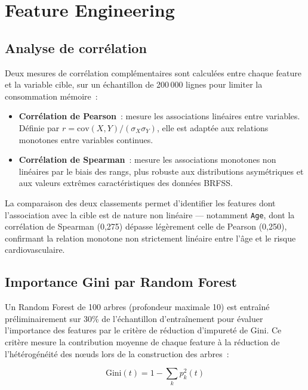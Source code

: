 \section{Feature Engineering}

\subsection{Analyse de corrélation}

Deux mesures de corrélation complémentaires sont calculées entre chaque feature et la variable cible, sur un échantillon de 200\,000 lignes pour limiter la consommation mémoire~:

\begin{itemize}
    \item \textbf{Corrélation de Pearson}~: mesure les associations linéaires entre variables. Définie par $r = \text{cov}(X,Y) / (\sigma_X \sigma_Y)$, elle est adaptée aux relations monotones entre variables continues.
    \item \textbf{Corrélation de Spearman}~: mesure les associations monotones non linéaires par le biais des rangs, plus robuste aux distributions asymétriques et aux valeurs extrêmes caractéristiques des données BRFSS.
\end{itemize}

La comparaison des deux classements permet d'identifier les features dont l'association avec la cible est de nature non linéaire — notamment \texttt{Age}, dont la corrélation de Spearman (0,275) dépasse légèrement celle de Pearson (0,250), confirmant la relation monotone non strictement linéaire entre l'âge et le risque cardiovasculaire.

\subsection{Importance Gini par Random Forest}

Un Random Forest de 100 arbres (profondeur maximale 10) est entraîné préliminairement sur 30\% de l'échantillon d'entraînement pour évaluer l'importance des features par le critère de réduction d'impureté de Gini. Ce critère mesure la contribution moyenne de chaque feature à la réduction de l'hétérogénéité des nœuds lors de la construction des arbres~:

\begin{equation}
\text{Gini}(t) = 1 - \sum_{k} p_k^2(t)
\end{equation}

